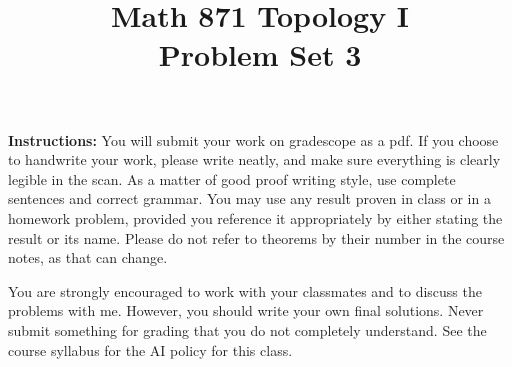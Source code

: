 \documentclass[12pt]{article}
\title{Math 871 Topology I\\[-0.1em]
\large Problem Set 3}
\author{}
\date{}
\begin{document}
\maketitle


	
\thispagestyle{fancy}
\pagestyle{fancy}





{\bf Instructions:}
You will submit your work on gradescope as a pdf. If you choose to handwrite your work, please write neatly, and make sure everything is clearly legible in the scan.
As a matter of good proof writing style, use complete sentences and correct grammar. You may use any result proven in class or in a homework problem, provided you reference it appropriately by either stating the result or its name. Please do not refer to theorems by their number in the course notes, as that can change.

You are strongly encouraged to work with your classmates and to discuss the problems with me. However, you should write your own final solutions.
Never submit something for grading that you do not completely understand. 
See the course syllabus for the AI policy for this class.
	
\vspace{2em}
\end{document}
